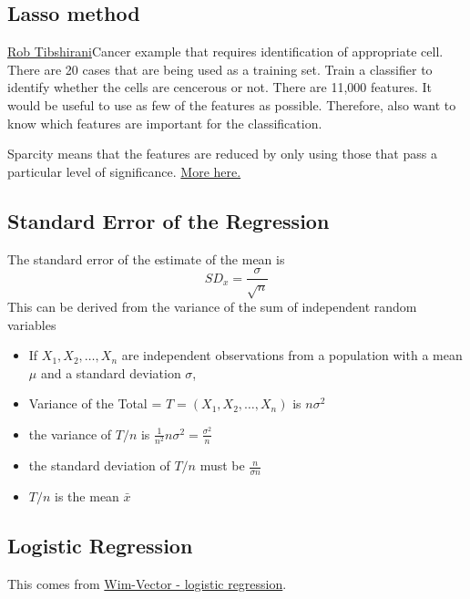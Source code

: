 \documentclass[12pt, a4paper, oneside]{article}\usepackage[]{graphicx}\usepackage[]{color}
\begin{document}
\subsection{Lasso method}
\href{http://www.mathtube.org/lecture/video/lasso-brief-review-and-new-significance-test#.U1aODV1sp94.twitter}{Rob Tibshirani}Cancer example that requires identification of appropriate cell. There are 20 cases that are being used as a training set.  Train a classifier to identify whether the cells are cencerous or not.  There are 11,000 features. It would be useful to use as few of the features as possible. Therefore, also want to know which features are important for the classification. 

Sparcity means that the features are reduced by only using those that pass a particular level of significance.  \href{http://statweb.stanford.edu/~tibs/lasso.html}{More here.}

\subsection{Standard Error of the Regression}
The standard error of the estimate of the mean is 
\begin{equation}
SD_x = \frac{\sigma}{\sqrt{n}}
\end{equation}
This can be derived from the variance of the sum of independent random variables
\begin{itemize}
\item If $X_1, X_2, \dots, X_n$ are independent observations from a population with a mean $\mu$ and a standard deviation $\sigma$, 
\item Variance of the Total = $T = (X_1, X_2, \dots, X_n)$ is $n\sigma^2$
\item the variance of $T/n$ is $\frac{1}{n^2}n\sigma^2 = \frac{\sigma^2}{n}$
\item the standard deviation of $T/n$ must be $\frac{n}{\sigma n}$
\item $T/n$ is the mean $\bar{x}$
\end{itemize}

\subsection{Logistic Regression}
This comes from \href{http://www.win-vector.com/blog/2010/11/learn-a-powerful-machine-learning-tool-logistic-regression-and-beyond/}{Wim-Vector - logistic regression}.  
\end{document}
